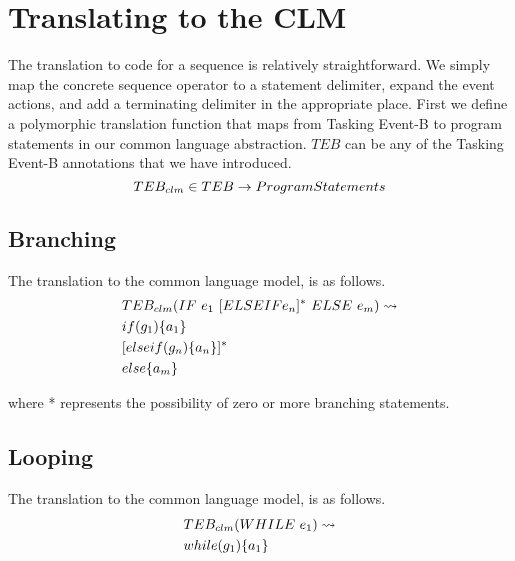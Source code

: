\section{Translating to the CLM}\label{TEBCLM}
The translation to code for a sequence is relatively straightforward. We simply map the concrete sequence operator to a statement delimiter, expand the event actions, and add a terminating delimiter in the appropriate place. First we define a polymorphic translation function that maps from Tasking Event-B to program statements in our common language abstraction.  $TEB$ can be any of the Tasking Event-B annotations that we have introduced.
\begin{equation}
TEB_{clm} \in  TEB \rightarrow ProgramStatements
\notag
\end{equation}

\subsection{Branching}
The translation to the common language model, is as follows.
\begin{equation}
\begin{split}
&TEB_{clm}(IF~ e_1~[ELSEIF e_n]^*~ELSE~ e_m) \leadsto\\
& if(g_1)\{ a_1 \} \\
&[elseif(g_n)\{a_n\}]^*\\
& else\{a_m \}
\end{split}
\notag
\end{equation}

where * represents the possibility of zero or more branching statements.

\subsection{Looping}
The translation to the common language model, is as follows.
\begin{equation}
\begin{split}
&TEB_{clm}(WHILE~ e_1 ) \leadsto\\
& while(g_1)\{ a_1 \}
\end{split}
\notag
\end{equation}

